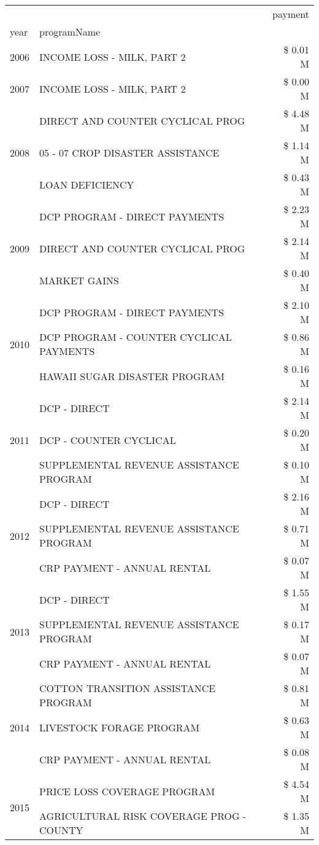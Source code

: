 \begin{tabular}{llr}
\toprule
 &  & payment \\
year & programName &  \\
\midrule
2006 & INCOME LOSS - MILK, PART 2 & \$ 0.01 M \\
\cline{1-3}
2007 & INCOME LOSS - MILK, PART 2 & \$ 0.00 M \\
\cline{1-3}
\multirow[t]{3}{*}{2008} & DIRECT AND COUNTER CYCLICAL PROG & \$ 4.48 M \\
 & 05 - 07 CROP DISASTER ASSISTANCE & \$ 1.14 M \\
 & LOAN DEFICIENCY & \$ 0.43 M \\
\cline{1-3}
\multirow[t]{3}{*}{2009} & DCP PROGRAM - DIRECT PAYMENTS & \$ 2.23 M \\
 & DIRECT AND COUNTER CYCLICAL PROG & \$ 2.14 M \\
 & MARKET GAINS & \$ 0.40 M \\
\cline{1-3}
\multirow[t]{3}{*}{2010} & DCP PROGRAM - DIRECT PAYMENTS & \$ 2.10 M \\
 & DCP PROGRAM - COUNTER CYCLICAL PAYMENTS & \$ 0.86 M \\
 & HAWAII SUGAR DISASTER PROGRAM & \$ 0.16 M \\
\cline{1-3}
\multirow[t]{3}{*}{2011} & DCP - DIRECT & \$ 2.14 M \\
 & DCP - COUNTER CYCLICAL & \$ 0.20 M \\
 & SUPPLEMENTAL REVENUE ASSISTANCE PROGRAM & \$ 0.10 M \\
\cline{1-3}
\multirow[t]{3}{*}{2012} & DCP - DIRECT & \$ 2.16 M \\
 & SUPPLEMENTAL REVENUE ASSISTANCE PROGRAM & \$ 0.71 M \\
 & CRP PAYMENT - ANNUAL RENTAL & \$ 0.07 M \\
\cline{1-3}
\multirow[t]{3}{*}{2013} & DCP - DIRECT & \$ 1.55 M \\
 & SUPPLEMENTAL REVENUE ASSISTANCE PROGRAM & \$ 0.17 M \\
 & CRP PAYMENT - ANNUAL RENTAL & \$ 0.07 M \\
\cline{1-3}
\multirow[t]{3}{*}{2014} & COTTON TRANSITION ASSISTANCE PROGRAM & \$ 0.81 M \\
 & LIVESTOCK FORAGE PROGRAM & \$ 0.63 M \\
 & CRP PAYMENT - ANNUAL RENTAL & \$ 0.08 M \\
\cline{1-3}
\multirow[t]{3}{*}{2015} & PRICE LOSS COVERAGE PROGRAM & \$ 4.54 M \\
 & AGRICULTURAL RISK COVERAGE PROG - COUNTY & \$ 1.35 M \\

\end{tabular}
